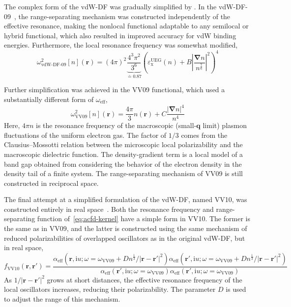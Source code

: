 The complex form of the vdW-DF was gradually simplified by \citeauthor{VydrovJCP09}.
In the vdW-DF-09~\cite{VydrovJCP09}, the range-separating mechanism was constructed independently of the effective resonance, making the nonlocal functional adaptable to any semilocal or hybrid functional, which also resulted in improved accuracy for vdW binding energies.
Furthermore, the local resonance frequency was somewhat modified,
\begin{equation}
  \omega^2_\text{vdW-DF-09}[n](\mathbf r)=(4\pi)^2\underbrace{\frac{4^3\pi^2}{3^6}}_{\doteq 0.87}\left(
      \varepsilon_\text{x}^\text{UEG}(n)
      +B\left\lvert\frac{\mathbf\nabla n}{n^\frac76}\right\rvert^2
      \right)^4
  \label{eq:vdw-df-09}
\end{equation}

Further simplification was achieved in the VV09 functional, which used a substantially different form of $\omega_\text{eff}$,
\begin{equation}
  \omega^2_\text{VV09}[n](\mathbf r)=\frac{4\pi}3n(\mathbf r)+C\frac{|\boldsymbol\nabla n|^4}{n^4}
  \label{eq:vv-pol}
\end{equation}
Here, $4\pi n$ is the resonance frequency of the macroscopic (small-$\mathbf q$ limit) plasmon fluctuations of the uniform electron gas.
The factor of $1/3$ comes from the Clausius--Mossotti relation between the microscopic local polarizability and the macroscopic dielectric function.
The density-gradient term is a local model of a band gap obtained from considering the behavior of the electron density in the density tail of a finite system.
The range-separating mechanism of VV09 is still constructed in reciprocal space.

The final attempt at a simplified formulation of the vdW-DF, named VV10, was constructed entirely in real space~\cite{VydrovJCP10a}.
Both the resonance frequency and range-separating function of~\eqref{eq:acfd-kernel} have a simple form in VV10.
The former is the same as in VV09, and the latter is constructed using the same mechanism of reduced polarizabilities of overlapped oscillators as in the original vdW-DF, but in real space,
\begin{equation}
  f_\text{VV10}(\mathbf r,\mathbf r')=\frac{\alpha_\text{eff}(\mathbf r,\mathrm iu;\omega=\omega_\text{VV09}+Dn^\frac13/|\mathbf r-\mathbf r'|^2)\alpha_\text{eff}(\mathbf r',\mathrm iu;\omega=\omega_\text{VV09}+Dn^\frac13/|\mathbf r-\mathbf r'|^2)}{\alpha_\text{eff}(\mathbf r',\mathrm iu;\omega=\omega_\text{VV09})\alpha_\text{eff}(\mathbf r',\mathrm iu;\omega=\omega_\text{VV09})}
\end{equation}
As $1/|\mathbf r-\mathbf r'|^2$ grows at short distances, the effective resonance frequency of the local oscillators increases, reducing their polarizability.
The parameter $D$ is used to adjust the range of this mechanism.

